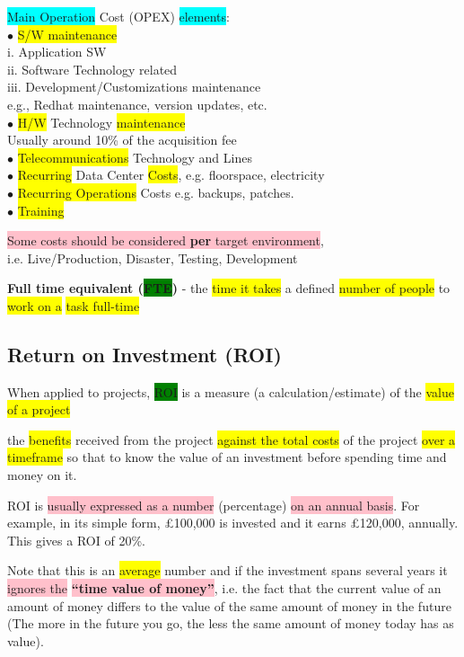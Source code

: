 \documentclass[]{project_plan}
\newcommand{\bulletPoint}{\hspace{-3.1pt}$\bullet$ \hspace{5pt}}
\begin{document}
\colorbox{cyan}{Main Operation} Cost (OPEX) \colorbox{cyan}{elements}:\\
\bulletPoint \colorbox{yellow}{S/W maintenance}\\
i. Application SW\\
ii. Software Technology related\\
iii. Development/Customizations maintenance\\
e.g., Redhat maintenance, version updates, etc.\\
\bulletPoint \colorbox{yellow}{H/W} Technology \colorbox{yellow}{maintenance}\\
Usually around 10\% of the acquisition fee\\
\bulletPoint \colorbox{yellow}{Telecommunications} Technology and Lines\\
\bulletPoint \colorbox{yellow}{Recurring} Data Center \colorbox{yellow}{Costs}, e.g. floorspace, electricity\\
\bulletPoint \colorbox{yellow}{Recurring Operations} Costs e.g. backups, patches.\\
\bulletPoint \colorbox{yellow}{Training}

\colorbox{pink}{Some costs should be considered \textbf{per} target environment},\\ i.e. Live/Production,
Disaster, Testing, Development

\textbf{Full time equivalent (\colorbox{green}{FTE})} - the \colorbox{yellow}{time it takes} a defined \colorbox{yellow}{number of people}
to \colorbox{yellow}{work on a} \colorbox{yellow}{task full-time}

\subsection{Return on Investment (ROI)}
When applied to projects, \colorbox{green}{ROI} is a measure (a calculation/estimate) of the \colorbox{yellow}{value of a project}

the \colorbox{yellow}{benefits} received from the project \colorbox{yellow}{against the total costs} of the project
\colorbox{yellow}{over a timeframe} so that to know the value of an investment before spending time
and money on it.

ROI is \colorbox{pink}{usually expressed as a number} (percentage) \colorbox{pink}{on an annual basis}. For example, in its simple form,
£100,000 is invested and it earns £120,000, annually. This gives a ROI of 20\%.

Note that this is an \colorbox{yellow}{average} number and if the investment spans several years it
\colorbox{pink}{ignores the} \colorbox{pink}{\textbf{“time value of money”}}, i.e. the fact that the current value
of an amount of money differs to the value of the same amount of money in the future
(The more in the future you go, the less the same amount of money today has as value).
\end{document}
